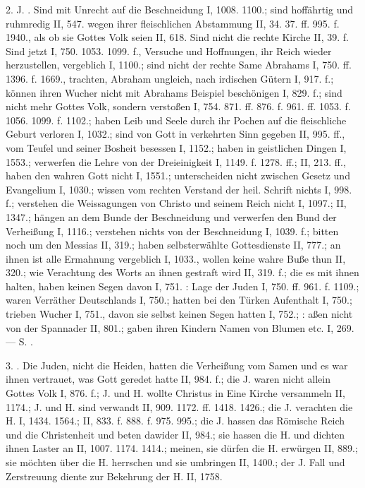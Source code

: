 2.  J. . Sind mit Unrecht  auf die Beschneidung I, 1008. 1100.; sind hoffährtig und ruhmredig II, 547. wegen ihrer fleischlichen Abstammung II, 34. 37. ff. 995. f. 1940., als ob sie Gottes Volk seien II, 618. Sind nicht die rechte Kirche II, 39. f. Sind jetzt  I, 750. 1053. 1099. f., Versuche und Hoffnungen, ihr Reich wieder herzustellen, vergeblich I, 1100.; sind nicht der rechte Same Abrahams I, 750. ff. 1396. f. 1669., trachten, Abraham ungleich, nach irdischen Gütern I, 917. f.; können ihren Wucher nicht mit Abrahams Beispiel beschönigen I, 829. f.; sind nicht mehr Gottes Volk, sondern verstoßen I, 754. 871. ff. 876. f. 961. ff. 1053. f. 1056. 1099. f. 1102.; haben Leib und Seele durch ihr Pochen auf die fleischliche Geburt verloren I, 1032.; sind von Gott in verkehrten Sinn gegeben II, 995. ff., vom Teufel und seiner Bosheit besessen I, 1152.; haben  in geistlichen Dingen I, 1553.; verwerfen die Lehre von der Dreieinigkeit I, 1149. f. 1278. ff.; II, 213. ff., haben den wahren Gott nicht I, 1551.; unterscheiden nicht zwischen Gesetz und Evangelium I, 1030.; wissen vom rechten Verstand der heil. Schrift nichts I, 998. f.; verstehen die Weissagungen von Christo und seinem Reich nicht I, 1097.; II, 1347.; hängen an dem Bunde der Beschneidung und verwerfen den Bund der Verheißung I, 1116.; verstehen nichts von der Beschneidung I, 1039. f.; bitten noch um den Messias II, 319.; haben selbsterwählte Gottesdienste II, 777.; an ihnen ist alle Ermahnung vergeblich I, 1033., wollen keine wahre Buße thun II, 320.; wie Verachtung des Worts an ihnen gestraft wird II, 319. f.; die es mit ihnen halten, haben keinen Segen davon I, 751. : Lage der Juden I, 750. ff. 961. f. 1109.; waren Verräther Deutschlands I, 750.; hatten bei den Türken Aufenthalt I, 750.; trieben Wucher I, 751., davon sie selbst keinen Segen hatten I, 752.; : aßen nicht von der Spannader II, 801.; gaben ihren Kindern Namen von Blumen etc. I, 269. — S. .

3. . Die Juden, nicht die Heiden, hatten die Verheißung vom Samen und es war ihnen vertrauet, was Gott geredet hatte II, 984. f.; die J. waren nicht allein Gottes Volk I, 876. f.; J. und H. wollte Christus in Eine Kirche versammeln II, 1174.; J. und H. sind verwandt II, 909. 1172. ff. 1418. 1426.; die J. verachten die H. I, 1434. 1564.; II, 833. f. 888. f. 975. 995.; die J. hassen das Römische Reich und die Christenheit und beten dawider II, 984.; sie hassen die H. und dichten ihnen Laster an II, 1007. 1174. 1414.; meinen, sie dürfen die H. erwürgen II, 889.; sie möchten über die H. herrschen und sie umbringen II, 1400.; der J. Fall und Zerstreuung diente zur Bekehrung der H. II, 1758.

